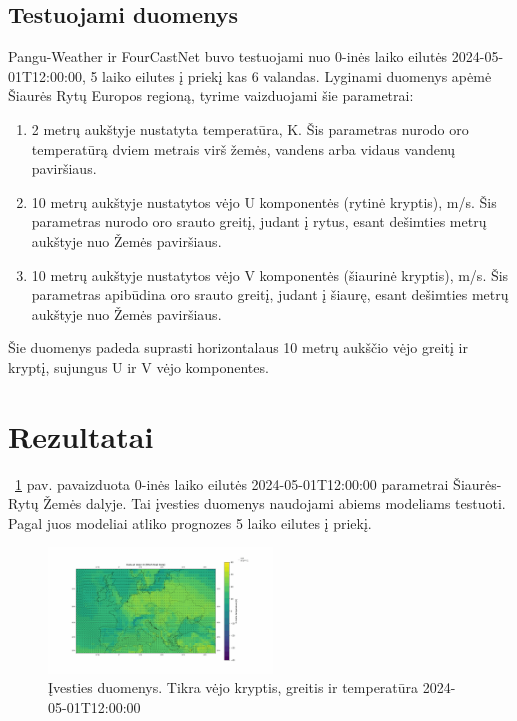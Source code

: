 \documentclass[conference]{IEEEtran}
\begin{document}
\subsection{Testuojami duomenys}
Pangu-Weather \cite{bi2023accurate} ir FourCastNet \cite{pathak2022fourcastnet} buvo testuojami nuo 0-inės laiko eilutės 2024-05-01T12:00:00, 5 laiko eilutes į priekį kas 6 valandas. Lyginami duomenys apėmė Šiaurės Rytų Europos regioną, tyrime vaizduojami šie parametrai:
\begin{enumerate}
\item 2 metrų aukštyje nustatyta temperatūra, K. Šis parametras nurodo oro temperatūrą dviem metrais virš žemės, vandens arba vidaus vandenų paviršiaus.
\item 10 metrų aukštyje nustatytos vėjo U komponentės (rytinė kryptis), m/s. Šis parametras nurodo oro srauto greitį, judant į rytus, esant dešimties metrų aukštyje nuo Žemės paviršiaus.
\item 10 metrų aukštyje nustatytos vėjo V komponentės (šiaurinė kryptis), m/s. Šis parametras apibūdina oro srauto greitį, judant į šiaurę, esant dešimties metrų aukštyje nuo Žemės paviršiaus. 
\end{enumerate}
Šie duomenys padeda suprasti horizontalaus 10 metrų aukščio vėjo greitį ir kryptį, sujungus U ir V vėjo komponentes.


\section{Rezultatai}

~\ref{fig1} pav. pavaizduota 0-inės laiko eilutės 2024-05-01T12:00:00 parametrai Šiaurės-Rytų Žemės dalyje. Tai įvesties duomenys naudojami abiems modeliams testuoti. Pagal juos modeliai atliko prognozes 5 laiko eilutes į priekį. 

\begin{figure}[htb!] %
\centerline{\includegraphics[width=0.53\textwidth]{img/frame_0_delay-1s.png}}
\caption{Įvesties duomenys. Tikra vėjo kryptis, greitis ir temperatūra 2024-05-01T12:00:00}
\label{fig1}
\end{figure}
\end{document}
